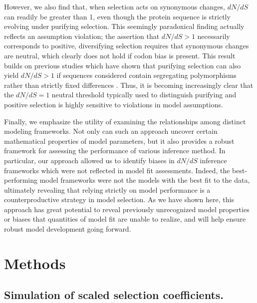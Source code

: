 \documentclass[11pt]{article}
\begin{document}
However, we also find that, when selection acts on synonymous changes, $dN/dS$ can readily be greater than 1, even though the protein sequence is strictly evolving under purifying selection. This seemingly paradoxical finding actually reflects an assumption violation; the assertion that $dN/dS > 1$ necessarily corresponds to positive, diversifying selection requires that synonymous changes are neutral, which clearly does not hold if codon bias is present. This result builds on previous studies which have shown that purifying selection can also yield $dN/dS > 1$ if sequences considered contain segregating polymorphisms rather than strictly fixed differences \cite{Rochaetal2006,KryazhimskiyPlotkin2008,Mugaletal2014}. Thus, it is becoming increasingly clear that the $dN/dS = 1$ neutral threshold typically used to distinguish purifying and positive selection is highly sensitive to violations in model assumptions. 

Finally, we emphasize the utility of examining the relationships among distinct modeling frameworks. Not only can such an approach uncover certain mathematical properties of model parameters, but it also provides a robust framework for assessing the performance of various inference method. In particular, our approach allowed us to identify biases in $dN/dS$ inference frameworks which were not reflected in model fit assessments. Indeed, the best-performing model frameworks were not the models with the best fit to the data, ultimately revealing that relying strictly on model performance is a counterproductive strategy in model selection. As we have shown here, this approach has great potential to reveal previously unrecognized model properties or biases that quantities of model fit are unable to realize, and will help ensure robust model development going forward.


		
\section*{Methods}

\subsection*{Simulation of scaled selection coefficients.}
\end{document}
